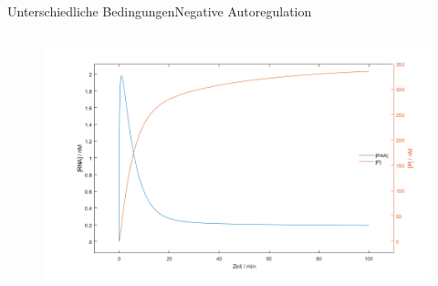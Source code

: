 \documentclass[11pt,aspectratio=169,reqno]{beamer}
\begin{document}
\begin{frame}{Unterschiedliche Bedingungen\hfill {\small \textcolor{ETHBlue}{Negative Autoregulation}}}
\begin{columns}
        \begin{figure}
            \centering
            \includegraphics[width=\linewidth]{images/simulations/negative_autoregulation_low_affinity.m.png}
        \end{figure}
    \end{columns}
\end{frame}
\end{document}
